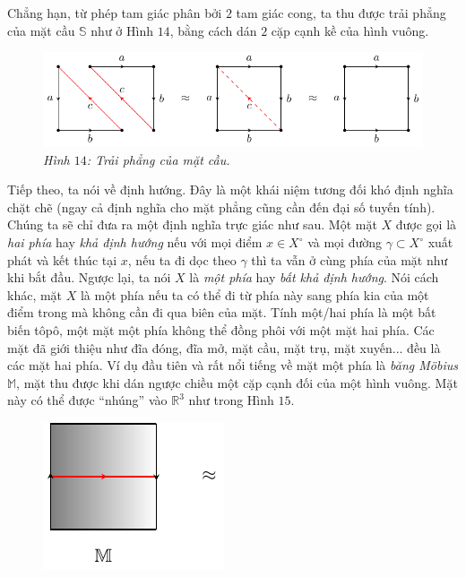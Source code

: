 \begin{multicols}{2}
	\vskip 0.1cm
	Chẳng hạn, từ phép tam giác phân bởi $2$ tam giác cong, ta thu được trải phẳng của mặt cầu $\mathbb{S}$ như ở Hình $14$, bằng cách dán $2$ cặp cạnh kề của hình vuông.
	\begin{figure}[H]
		\centering\captionsetup{labelformat=empty, justification=centering}
		\includegraphics[width=1\linewidth]{H14.pdf}
		\caption{\small\textit{\color{duongvaotoanhoc}Hình $14$: Trải phẳng của mặt cầu.}}
		\vspace*{-10pt}
	\end{figure}
	Tiếp theo, ta nói về định hướng. Đây là một khái niệm tương đối khó định nghĩa chặt chẽ (ngay cả định nghĩa cho mặt phẳng cũng cần đến đại số tuyến tính). Chúng ta sẽ chỉ đưa ra một định nghĩa trực giác như sau. Một mặt $X$ được gọi là {\it hai phía} hay {\it khả định hướng} nếu với mọi điểm $x \in X^\circ$ và mọi đường $\gamma \subset X^\circ$ xuất phát và kết thúc tại $x$, nếu ta đi dọc theo $\gamma$ thì ta vẫn ở cùng phía của mặt như khi bắt đầu. Ngược lại, ta nói $X$ là {\it một phía} hay {\it bất khả định hướng}.
	\vskip 0.1cm
	Nói cách khác, mặt $X$ là một phía nếu ta có thể đi từ phía này sang phía kia của một điểm trong mà không cần đi qua biên của mặt. Tính một/hai phía là một bất biến tôpô, một mặt một phía không thể đồng phôi với một mặt hai phía. Các mặt đã giới thiệu như đĩa đóng, đĩa mở, mặt cầu, mặt trụ, mặt xuyến... đều là các mặt hai phía. Ví dụ đầu tiên và rất nổi tiếng về mặt một phía là {\it băng M\"obius} $\mathbb{M}$, mặt thu được khi dán ngược chiều một cặp cạnh đối của một hình vuông. Mặt này có thể được ``nhúng'' vào $\mathbb{R}^3$ như trong Hình $15$.
	\begin{figure}[H]
		\vspace*{-5pt}
		\centering\captionsetup{labelformat=empty, justification=centering}
		\includegraphics[width=0.48\linewidth]{H15_1.pdf}

\end{figure}
\end{multicols}

